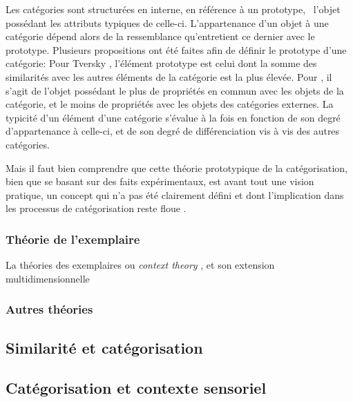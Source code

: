 Les catégories sont structurées en interne, en référence à un prototype, \ie~l'objet possédant les attributs typiques de celle-ci. L'appartenance d'un objet à une catégorie dépend alors de la ressemblance qu'entretient ce dernier avec le prototype.  Plusieurs propositions ont été faites afin de définir le prototype d'une catégorie: Pour Tversky \citep{tversky1977features}, l'élément prototype est celui dont la somme des similarités avec les autres éléments de la catégorie est la plus élevée. Pour \citep{rosch1975family}, il s'agit de l'objet possédant le plus de propriétés en commun avec les objets de la catégorie, et le moins de propriétés avec les objets des catégories externes. La typicité d'un élément d'une catégorie s'évalue à la fois en fonction de son degré d'appartenance à celle-ci, et de son degré de différenciation vis à vis des autres catégories. 


Mais il faut bien comprendre que cette théorie prototypique de la catégorisation, bien que se basant sur des faits expérimentaux, est avant tout une vision pratique, un concept qui n'a pas été clairement défini et dont l'implication dans les processus de catégorisation reste floue \citep[p. 36-40]{rosch1978cognition} \citep[p. 49-54]{dubois1991semantique}.

\subsubsection{Théorie de l'exemplaire}

La théories des exemplaires ou \textit{context theory} \citep{medin1978context}, et son extension multidimensionnelle \citep{medin1978context}

\subsubsection{Autres théories}

\subsection{Similarité et catégorisation}

\subsection{Catégorisation et contexte sensoriel}
\label{sec:ch3_identification et Contexte}

